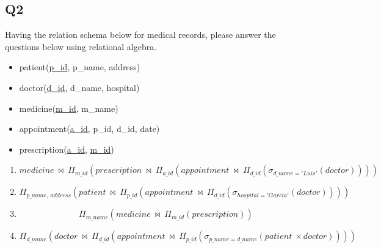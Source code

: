 \documentclass{homework}
\begin{document}
\subsection*{Q2}
Having the relation schema below for medical records, please answer the questions below using relational algebra.
\begin{itemize}[label=]
    \item patient(\underline{p\_id}, p\_name, address)
    \item doctor(\underline{d\_id}, d\_name, hospital)
    \item medicine(\underline{m\_id}, m\_name)
    \item appointment(\underline{a\_id}, p\_id, d\_id, date)
    \item prescription(\underline{a\_id}, \underline{m\_id})
\end{itemize}
\begin{enumerate}[label=\alph*)]
    \item 
    \[medicine\:\bowtie \:\Pi _{m\_id}\left(prescription\:\bowtie \:\Pi _{a\_id}\left(appointment\:\bowtie \:\Pi _{d\_id}\left(\sigma _{d\_name='Luis'}\left(doctor\right)\right)\right)\right)\]
    \item 
    \[\Pi _{p\_name,\:address}\left(patient\:\bowtie \:\Pi _{p\_id}\left(appointment\:\bowtie \:\Pi _{d\_id}\left(\sigma _{hospital='Garcia'}\left(doctor\right)\right)\right)\right)\]
    \item
    \[\Pi _{m\_name}\left(medicine\:\bowtie \:\Pi _{m\_id}\left(prescription\right)\right)\]
    \item 
    \[\Pi _{d\_name}\left(doctor\:\bowtie \:\Pi _{d\_id}\left(appointment\:\bowtie \:\Pi _{p\_id}\left(\sigma _{p\_name=d\_name}\left(patient\:\times doctor\right)\right)\right)\right)\]
\end{enumerate}






\end{document}
